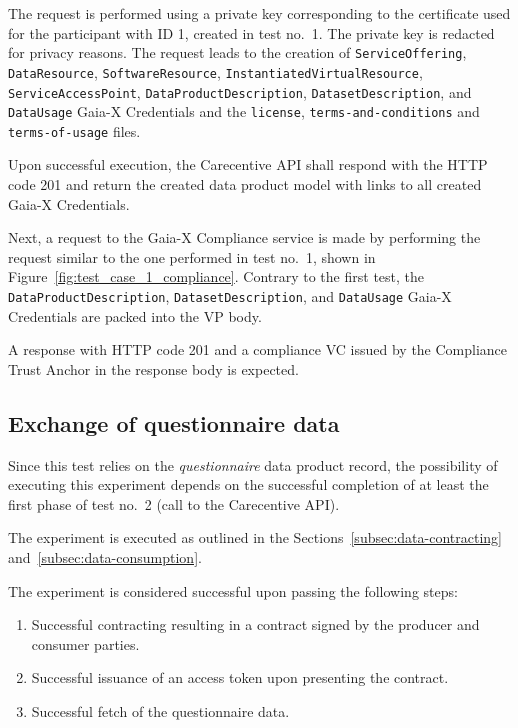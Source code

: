 The request is performed using a private key corresponding to the certificate used for the participant with ID 1, created in test no.~1.
The private key is redacted for privacy reasons.
The request leads to the creation of \texttt{ServiceOffering}, \texttt{DataResource}, \texttt{SoftwareResource}, \texttt{InstantiatedVirtualResource}, \texttt{ServiceAccessPoint}, \texttt{DataProductDescription}, \texttt{DatasetDescription}, and \texttt{DataUsage} Gaia-X Credentials and the \texttt{license}, \texttt{terms-and-conditions} and \texttt{terms-of-usage} files.

Upon successful execution, the Carecentive API shall respond with the HTTP code 201 and return the created data product model with links to all created Gaia-X Credentials.

Next, a request to the Gaia-X Compliance service is made by performing the request similar to the one performed in test no.~1, shown in Figure~\ref{fig:test_case_1_compliance}.
Contrary to the first test, the \texttt{DataProductDescription}, \texttt{DatasetDescription}, and \texttt{DataUsage} Gaia-X Credentials are packed into the VP body.

A response with HTTP code 201 and a compliance VC issued by the Compliance Trust Anchor in the response body is expected.

\subsection{Exchange of questionnaire data}\label{subsec:exchange-of-questionnaire-data}

Since this test relies on the \textit{questionnaire} data product record, the possibility of executing this experiment depends on the successful completion of at least the first phase of test no.~2 (call to the Carecentive API).

The experiment is executed as outlined in the Sections~\ref{subsec:data-contracting} and~\ref{subsec:data-consumption}.

The experiment is considered successful upon passing the following steps:
\begin{enumerate}
    \item Successful contracting resulting in a contract signed by the producer and consumer parties.
    \item Successful issuance of an access token upon presenting the contract.
    \item Successful fetch of the questionnaire data.
\end{enumerate}

